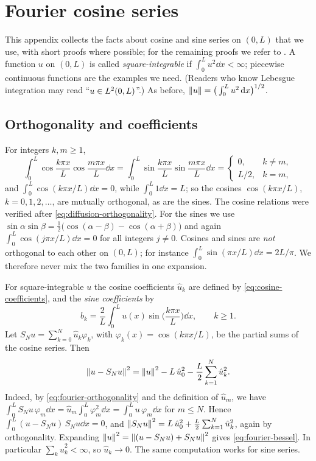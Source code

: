 \chapter{Fourier cosine series}\label{app:fourier}

This appendix collects the facts about cosine and sine series on $(0,L)$ that we use,
with short proofs where possible; for the remaining proofs we refer to
\cite{Strauss2008}. A function $u$ on $(0,L)$ is called \emph{square-integrable} if
$\int_0^Lu^2\dd x<\infty$; piecewise continuous functions are the examples we need.
(Readers who know Lebesgue integration may read ``$u\in L^2(0,L)$''.) As before,
$\left\lVert u\right\rVert=\big(\int_0^Lu^2\,\mathrm{d} x\big)^{1/2}$.

\section{Orthogonality and coefficients}\label{sec:fourier-orthogonality}

For integers $k,m\ge1$,
\begin{equation}\label{eq:fourier-orthogonality}
  \int_0^L\cos\frac{k\pi x}{L}\cos\frac{m\pi x}{L}\dd x
  = \int_0^L\sin\frac{k\pi x}{L}\sin\frac{m\pi x}{L}\dd x
  = \begin{cases} 0, & k\neq m,\\ L/2, & k=m, \end{cases}
\end{equation}
and $\int_0^L\cos(k\pi x/L)\dd x=0$, while $\int_0^L1\dd x=L$; so the cosines
$\cos(k\pi x/L)$, $k=0,1,2,\dots$, are mutually orthogonal, as are the sines. The
cosine relations were verified after \eqref{eq:diffusion-orthogonality}. For the
sines we use $\sin\alpha\sin\beta=\frac12\big(\cos(\alpha-\beta)-\cos(\alpha+\beta)\big)$
and again $\int_0^L\cos(j\pi x/L)\dd x=0$ for all integers $j\neq0$. Cosines and sines
are \emph{not} orthogonal to each other on $(0,L)$; for instance
$\int_0^L\sin(\pi x/L)\dd x=2L/\pi$. We therefore never mix the two families in one
expansion.

For square-integrable $u$ the cosine coefficients $\hat u_k$ are defined by
\eqref{eq:cosine-coefficients}, and the \emph{sine coefficients} by
\begin{equation}\label{eq:fourier-sine-coefficients}
  b_k = \frac2L\int_0^L u(x)\sin\Big(\frac{k\pi x}{L}\Big)\dd x,\qquad k\ge1 .
\end{equation}
Let $S_Nu=\sum_{k=0}^N\hat u_k\varphi_k$, with $\varphi_k(x)=\cos(k\pi x/L)$, be the
partial sums of the cosine series. Then
\begin{equation}\label{eq:fourier-bessel}
  \left\lVert u-S_Nu\right\rVert^2 = \left\lVert u\right\rVert^2 - L\,\hat u_0^2 - \frac L2\sum_{k=1}^N\hat u_k^2 .
\end{equation}
Indeed, by \eqref{eq:fourier-orthogonality} and the definition of $\hat u_m$, we have
$\int_0^LS_Nu\,\varphi_m\dd x=\hat u_m\int_0^L\varphi_m^2\dd x=\int_0^Lu\,\varphi_m\dd x$
for $m\le N$. Hence $\int_0^L(u-S_Nu)\,S_Nu\dd x=0$, and
$\left\lVert S_Nu\right\rVert^2=L\,\hat u_0^2+\frac L2\sum_{k=1}^N\hat u_k^2$, again by
orthogonality. Expanding $\left\lVert u\right\rVert^2=\left\lVert (u-S_Nu)+S_Nu\right\rVert^2$ gives
\eqref{eq:fourier-bessel}. In particular $\sum_k\hat u_k^2<\infty$, so
$\hat u_k\to0$. The same computation works for sine series.

